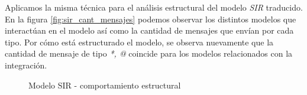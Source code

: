 Aplicamos la misma técnica para el análisis estructural del modelo \textit{SIR} traducido.
En la figura \ref{fig:sir_cant_mensajes} podemos observar los distintos modelos
que interactúan en el modelo así como la cantidad de mensajes que envían por
cada tipo.
Por cómo está estructurado el modelo, se observa nuevamente que la cantidad de
mensaje de tipo \textit{*, @} coincide para los modelos relacionados con la
integración. 

\begin{figure}[H]
	\centering     %
        \caption{Modelo SIR - comportamiento estructural}
\end{figure}
